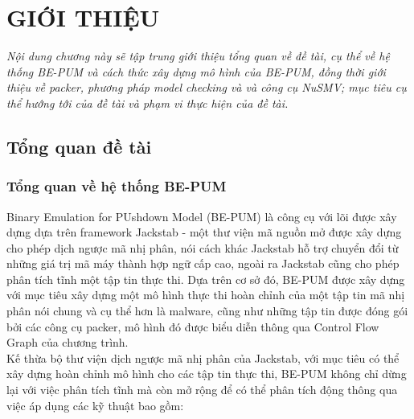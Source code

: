
\newpage
{}

\chapter{GIỚI THIỆU}

\begin{concept}[15cm]
\textit{Nội dung chương này sẽ tập trung giới thiệu tổng quan về đề tài, cụ thể về hệ thống BE-PUM và cách thức xây dựng mô hình của BE-PUM, đồng thời giới thiệu về packer, phương pháp model checking và và công cụ NuSMV; mục tiêu cụ thể hướng tới của đề tài và phạm vi thực hiện của đề tài.}
\end{concept}

\section{Tổng quan đề tài}

\subsection{Tổng quan về hệ thống BE-PUM}

\hspace{0.5cm}Binary Emulation for PUshdown Model (BE-PUM) là công cụ với lõi được xây dựng dựa trên framework Jackstab - một thư viện mã nguồn mở được xây dựng cho phép dịch ngược mã nhị phân, nói cách khác Jackstab hỗ trợ chuyển đổi từ những giá trị mã máy thành hợp ngữ cấp cao, ngoài ra Jackstab cũng cho phép phân tích tĩnh một tập tin thực thi. Dựa trên cơ sở đó, BE-PUM được xây dựng với mục tiêu xây dựng một mô hình thực thi hoàn chỉnh của một tập tin mã nhị phân nói chung và cụ thể hơn là malware, cũng như những tập tin được đóng gói bởi các công cụ packer, mô hình đó được biểu diễn thông qua Control Flow Graph của chương trình.\\ 

\hspace{0.5cm}Kế thừa bộ thư viện dịch ngược mã nhị phân của Jackstab, với mục tiêu có thể xây dựng hoàn chỉnh mô hình cho các tập tin thực thi, BE-PUM không chỉ dừng lại với việc phân tích tĩnh mà còn mở rộng để có thể phân tích động thông qua việc áp dụng các kỹ thuật bao gồm:

